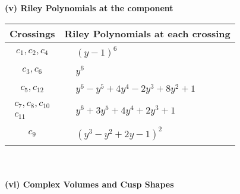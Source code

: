 \documentclass[1p]{elsarticle_modified}
\theoremstyle{definition}
\begin{document}
\newpage\renewcommand{\arraystretch}{1}
\flushleft \textbf{(v) Riley Polynomials at the component}\newline \\
\begin{tabular}{m{50pt}|m{274pt}}
Crossings & \hspace{64pt}Riley Polynomials at each crossing \\
\hline $$\begin{aligned}c_{1},c_{2},c_{4}\end{aligned}$$&$\begin{aligned}
&(y-1)^6
\end{aligned}$\\
\hline $$\begin{aligned}c_{3},c_{6}\end{aligned}$$&$\begin{aligned}
&y^6
\end{aligned}$\\
\hline $$\begin{aligned}c_{5},c_{12}\end{aligned}$$&$\begin{aligned}
&y^6- y^5+4 y^4-2 y^3+8 y^2+1
\end{aligned}$\\
\hline $$\begin{aligned}c_{7},c_{8},c_{10}\\c_{11}\end{aligned}$$&$\begin{aligned}
&y^6+3 y^5+4 y^4+2 y^3+1
\end{aligned}$\\
\hline $$\begin{aligned}c_{9}\end{aligned}$$&$\begin{aligned}
&(y^3- y^2+2 y-1)^2
\end{aligned}$\\
\hline
\end{tabular}\\~\\
\newpage\flushleft \textbf{(vi) Complex Volumes and Cusp Shapes}
\end{document}
